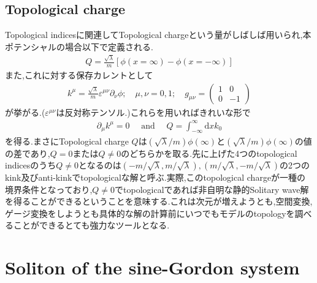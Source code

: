 \documentclass[dvipdfmx,11pt,a4paper]{jsbook}
\begin{document}
\subsection{Topological charge}
Topological indicesに関連してTopological chargeという量がしばしば用いられ,本ポテンシャルの場合以下で定義される.
\begin{align}
    Q=\frac{\sqrt{\lambda}}{m}[\phi(x=\infty)-\phi(x=-\infty)]
\end{align}
また,これに対する保存カレントとして
\begin{align}
    k^{\mu}=\frac{\sqrt{\lambda}}{m} \varepsilon^{\mu \nu} \partial_{\nu} \phi;\quad \mu,\nu=0,1;\quad g_{\mu \nu}=
    \begin{pmatrix}
        1 & 0  \\
        0 & -1
    \end{pmatrix}
\end{align}
が挙がる.($\varepsilon^{\mu\nu}$は反対称テンソル.)これらを用いればきれいな形で
\begin{align}
    \partial_{\mu} k^{\mu}=0 \quad \text { and } \quad Q=\int_{-\infty}^{\infty} \mathrm{d} x k_{0}
\end{align}
を得る.まさにTopological charge $Q$は$(\sqrt{\lambda}/m)\phi(\infty)$と$(\sqrt{\lambda}/m)\phi(\infty)$の値の差であり,$Q=0$または$Q\neq 0$のどちらかを取る.先に上げた4つのtopological indicesのうち$Q\neq0$となるのは$(-m/\sqrt{\lambda},m/\sqrt{\lambda}),(m/\sqrt{\lambda},-m/\sqrt{\lambda})$の2つのkink及びanti-kinkでtopologicalな解と呼ぶ.実際,このtopological chargeが一種の境界条件となっており,$Q\neq0$でtopologicalであれば非自明な静的Solitary wave解を得ることができるということを意味する.これは次元が増えようとも,空間変換,ゲージ変換をしようとも具体的な解の計算前にいつでもモデルのtopologyを調べることができるとても強力なツールとなる.

\section{Soliton of the sine-Gordon system}
\end{document}
